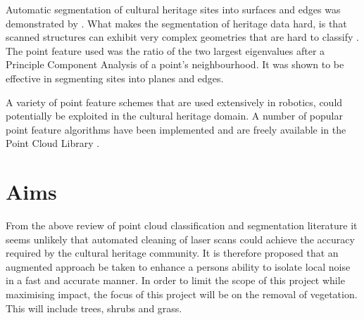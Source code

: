 \documentclass[10pt,twocolumn]{article}
\begin{document}
Automatic segmentation of cultural heritage sites into surfaces and edges was demonstrated by \citep{Spina2010}. What makes the segmentation of heritage data hard, is that scanned structures can exhibit very complex geometries that are hard to classify \cite{Spina2010}. The point feature used was the ratio of the two largest eigenvalues after a Principle Component Analysis of a point's neighbourhood. It was shown to be effective in segmenting sites into planes and edges.

A variety of point feature schemes that are used extensively in robotics, could potentially be exploited in the cultural heritage domain. A number of popular point feature algorithms have been implemented and are freely available in the Point Cloud Library \cite{Rusu2011}.







\section{Aims}
From the above review of point cloud classification and segmentation literature it seems unlikely that automated cleaning of laser scans could achieve the accuracy required by the cultural heritage community. It is therefore proposed that an augmented approach be taken to enhance a persons ability to isolate local noise in a fast and accurate manner. In order to limit the scope of this project while maximising impact, the focus of this project will be on the removal of vegetation. This will include trees, shrubs and grass.
\end{document}

